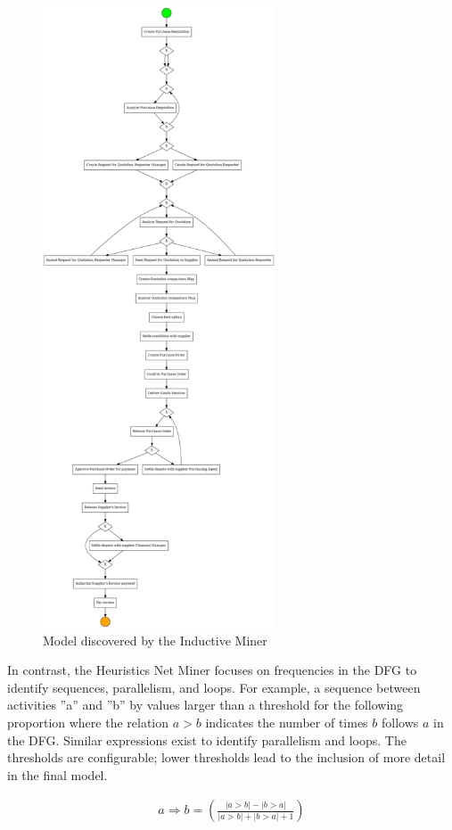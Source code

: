 \begin{figure}
\centering
\includegraphics[height=7.25in]{bpmn.png}
\caption{Model discovered by the Inductive Miner}
\label{fig:inductive_example}
\end{figure}

In contrast, the Heuristics Net Miner  focuses on frequencies in the DFG to identify sequences, parallelism, and loops. For example, a sequence between activities ''a'' and ''b'' by values larger than a threshold for the following proportion where the relation $a > b$ indicates the number of times $b$ follows $a$ in the DFG. Similar expressions exist to identify parallelism and loops. The thresholds are configurable; lower thresholds lead to the inclusion of more detail in the final model.

\begin{align*}
a \Rightarrow b = \left( \frac{
| a > b| - |b > a|}{
| a > b| + |b > a| + 1}\right)
\end{align*}
 
